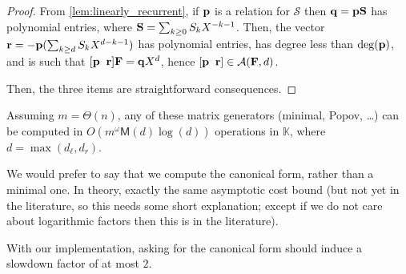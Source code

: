 \documentclass[12pt]{article}
\newcommand{\var}{X} %
\newcommand{\field}{\mathbb{K}} %
\newcommand{\mat}[1]{\mathbf{\MakeUppercase{#1}}} %
\newcommand{\row}[1]{\mathbf{\MakeLowercase{#1}}} %
\newcommand{\col}[1]{\mathbf{\MakeLowercase{#1}}} %
\newcommand{\rdim}{m} %
\newcommand{\cdim}{n} %
\newcommand{\seqelt}[1]{S_{#1}} %
\newcommand{\seq}{\mathcal{S}} %
\newcommand{\seqpm}{\mat{S}} %
\newcommand{\rel}{\col{p}} %
\newcommand{\num}{\row{q}} %
\newcommand{\rem}{\row{r}} %
\newcommand{\degBd}{d} %
\newcommand{\degBdr}{d_{r}} %
\newcommand{\degBdl}{d_{\ell}} %
\newcommand{\sys}{\mat{F}} %
\newcommand{\appMod}[2]{\mathcal{A}(#1,#2)} %
\begin{document}
\begin{proof}
  From \cref{lem:linearly_recurrent}, if $\rel$ is a relation for $\seq$ then
  $\num = \rel \seqpm$ has polynomial entries, where $\seqpm = \sum_{k\ge 0}
  \seqelt{k} \var^{-k-1}$. Then, the vector $\rem = - \rel (\sum_{k \ge \degBd}
  \seqelt{k} \var^{\degBd-k-1})$ has polynomial entries, has degree less than
  $\deg(\rel)$, and is such that $[\rel \;\; \rem] \sys = \num \var^{\degBd}$,
  hence $[\rel \;\; \rem] \in \appMod{\sys}{\degBd}$.


  
  Then, the three items are straightforward consequences.
\end{proof}

\begin{corollary}
  Assuming $\rdim = \Theta(\cdim)$, any of these matrix generators (minimal,
  Popov, \ldots) can be computed in $O(\rdim^\omega \mathsf{M}(\degBd)
  \log(\degBd))$ operations in $\field$, where $d =\max(\degBdl,\degBdr)$.
\end{corollary}

We would prefer to say that we compute the canonical form, rather than a
minimal one. In theory, exactly the same asymptotic cost bound (but not yet in
the literature, so this needs some short explanation; except if we do not care
about logarithmic factors then this is in the literature).

With our implementation, asking for the canonical form should induce a slowdown
factor of at most $2$.



\end{document}
